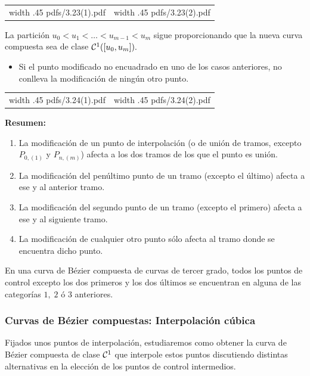 \documentclass[twoside]{report}
\newcommand{\colocapdf}[2]{\quad\pdfimage width #2 {pdfs/#1.pdf}}
\begin{document}
\begin{center}
\begin{tabular}{cc}
\colocapdf{3.23(1)}{.45\textwidth} &
\colocapdf{3.23(2)}{.45\textwidth}
\end{tabular}
\end{center}

La partición $u_0<u_1<\ldots<u_{m-1}<u_m$ sigue proporcionando que la nueva curva compuesta sea de clase ${\cal C}^1([u_0,u_m]).$

\begin{itemize}
\item Si el punto modificado no encuadrado en uno de los casos anteriores, no conlleva la modificación de ningún otro punto.
\end{itemize}

\begin{center}
\begin{tabular}{cc}
\colocapdf{3.24(1)}{.45\textwidth} &
\colocapdf{3.24(2)}{.45\textwidth}
\end{tabular}
\end{center}

{\bf Resumen:}

\begin{enumerate}
\item La modificación de un punto de interpolación (o de unión de tramos, excepto $P_{0,(1)}$  y $P_{n, (m)}$) afecta a los dos tramos de los que el punto es unión.
\item La modificación del penúltimo punto de un tramo (excepto el último) afecta a ese y al anterior tramo.
\item La modificación del segundo punto de un tramo (excepto el primero) afecta a ese y al siguiente tramo.
\item La modificación de cualquier otro punto sólo afecta al tramo donde se encuentra dicho punto.
\end{enumerate}

En una curva de Bézier compuesta de curvas de tercer grado, todos los puntos de control excepto los dos primeros y los dos últimos se encuentran en alguna de las categorías $1,\;2$ ó $3$ anteriores.

\subsubsection{Curvas de Bézier compuestas: Interpolación cúbica}

Fijados unos puntos de interpolación, estudiaremos como obtener la curva de Bézier compuesta de clase ${\cal C}^1$ que interpole estos puntos discutiendo distintas alternativas en la elección de los puntos de control intermedios.
\end{document}
